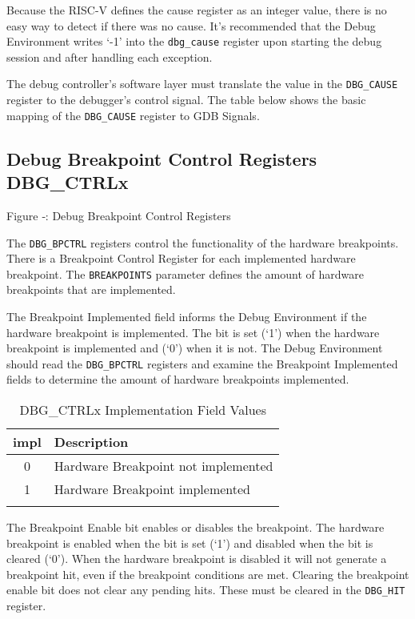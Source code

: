 Because the RISC-V defines the cause register as an integer value, there
is no easy way to detect if there was no cause. It's recommended that
the Debug Environment writes `-1' into the \texttt{dbg\_cause} register upon
starting the debug session and after handling each exception.

The debug controller's software layer must translate the value in the
\texttt{DBG\_CAUSE} register to the debugger's control signal. The table below
shows the basic mapping of the \texttt{DBG\_CAUSE} register to GDB Signals.

\subsection{Debug Breakpoint Control Registers
DBG\_CTRLx}\label{debug-breakpoint-control-registers-dbg_ctrlx}

\missingfigure{}

Figure ‑: Debug Breakpoint Control Registers

The \texttt{DBG\_BPCTRL} registers control the functionality of the hardware
breakpoints. There is a Breakpoint Control Register for each implemented
hardware breakpoint. The \texttt{BREAKPOINTS} parameter defines the amount of
hardware breakpoints that are implemented.

The Breakpoint Implemented field informs the Debug Environment if the
hardware breakpoint is implemented. The bit is set (`1') when the
hardware breakpoint is implemented and (`0') when it is not. The Debug
Environment should read the \texttt{DBG\_BPCTRL} registers and examine the
Breakpoint Implemented fields to determine the amount of hardware
breakpoints implemented.

\begin{longtable}[]{@{}cl@{}}
\toprule
impl & Description\tabularnewline
\midrule
\endhead
0 & Hardware Breakpoint not implemented\tabularnewline
1 & Hardware Breakpoint implemented\tabularnewline
\bottomrule
\caption{DBG\_CTRLx Implementation Field Values}
\end{longtable}


The Breakpoint Enable bit enables or disables the breakpoint. The
hardware breakpoint is enabled when the bit is set (`1') and disabled
when the bit is cleared (`0'). When the hardware breakpoint is disabled
it will not generate a breakpoint hit, even if the breakpoint conditions
are met. Clearing the breakpoint enable bit does not clear any pending
hits. These must be cleared in the \texttt{DBG\_HIT} register.

